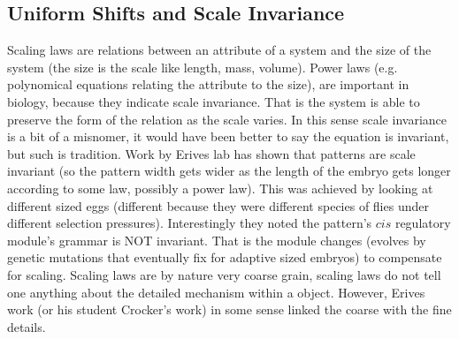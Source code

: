 \subsection{Uniform Shifts and Scale Invariance}

Scaling laws are relations between an attribute of a system and the size of the system (the size is the scale like length, mass, volume).
Power laws (e.g. polynomical equations relating the attribute to the size), are important in biology, because they indicate scale invariance.  That is the system is able to preserve the form of the relation as the scale varies.  In this sense scale invariance is a bit of a misnomer, it would have been better to say the equation is invariant, but such is tradition.
Work by Erives lab has shown that patterns are scale invariant (so the pattern width gets wider as the length of the embryo gets longer according to some law, possibly a power law).  This was achieved by looking at different sized eggs (different because they were different species of flies under different selection pressures).  Interestingly they noted the pattern's $cis$ regulatory module's grammar is NOT invariant.  That is the module changes (evolves by genetic mutations that eventually fix for adaptive sized embryos) to compensate for scaling.  Scaling laws are by nature very coarse grain, scaling laws do not tell one anything about the detailed mechanism within a object.  However, Erives work (or his student Crocker's work) in some sense linked the coarse with the fine details.
%
%
